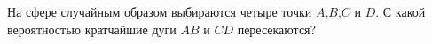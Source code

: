 \documentclass{article}
\begin{document}
На сфере случайным образом выбираются четыре точки $A$,$B$,$C$ и $D$. С какой вероятностью кратчайшие дуги $AB$ и $CD$ пересекаются?
\end{document}
